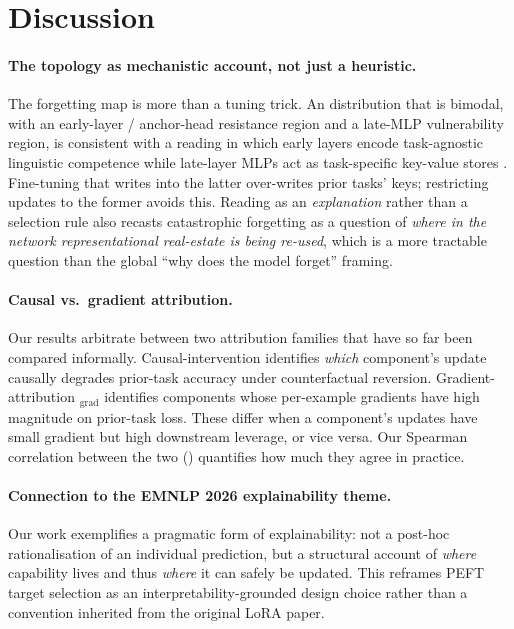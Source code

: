 \section{Discussion}
\label{sec:discussion}

\paragraph{The topology as mechanistic account, not just a heuristic.} The forgetting map is more than a tuning trick. An \fvs{} distribution that is bimodal, with an early-layer / anchor-head resistance region and a late-MLP vulnerability region, is consistent with a reading in which early layers encode task-agnostic linguistic competence while late-layer MLPs act as task-specific key-value stores \citep{geva2023dissecting}. Fine-tuning that writes into the latter over-writes prior tasks' keys; restricting updates to the former avoids this. Reading \fvs{} as an \textit{explanation} rather than a selection rule also recasts catastrophic forgetting as a question of \textit{where in the network representational real-estate is being re-used}, which is a more tractable question than the global ``why does the model forget'' framing.

\paragraph{Causal vs.\ gradient attribution.} Our results arbitrate between two attribution families that have so far been compared informally. Causal-intervention \fvs{} identifies \textit{which} component's update causally degrades prior-task accuracy under counterfactual reversion. Gradient-attribution \fvs$_{\mathrm{grad}}$ identifies components whose per-example gradients have high magnitude on prior-task loss. These differ when a component's updates have small gradient but high downstream leverage, or vice versa. Our Spearman correlation between the two () quantifies how much they agree in practice.

\paragraph{Connection to the EMNLP 2026 explainability theme.} Our work exemplifies a pragmatic form of explainability: not a post-hoc rationalisation of an individual prediction, but a structural account of \textit{where} capability lives and thus \textit{where} it can safely be updated. This reframes PEFT target selection as an interpretability-grounded design choice rather than a convention inherited from the original LoRA paper.

